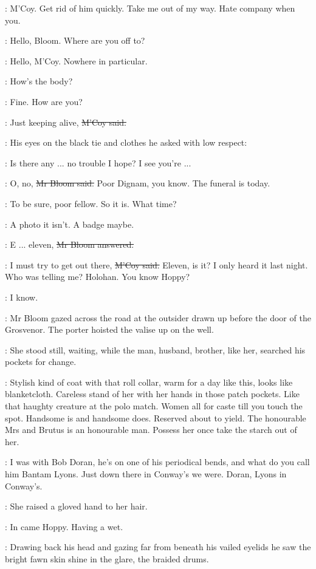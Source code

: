 \BloomInt:
M'Coy.
Get rid of him quickly.
Take me out of my way.
Hate company when you.

\mccoy:
Hello, Bloom.
Where are you off to?

\Bloom:
Hello, M'Coy.
Nowhere in particular.

\mccoy:
How's the body?

\Bloom:
Fine.
How are you?

\mccoy:
Just keeping alive,
\sout{M'Coy said.}

:
His eyes on the black tie and clothes
he asked with low respect:

\mccoy:
Is there any ... no trouble I hope?
I see you're ...

\Bloom:
O, no, \sout{Mr Bloom said.}
Poor Dignam, you know.
The funeral is today.

\mccoy:
To be sure, poor fellow.
So it is.
What time?

\BloomInt:
A photo it isn't.
A badge maybe.

\Bloom:
E ... eleven,
\sout{Mr Bloom answered.}

\mccoy:
I must try to get out there,
\sout{M'Coy said.}
Eleven, is it?
I only heard it last night.
Who was telling me?
Holohan.
You know Hoppy?

\Bloom:
I know.

:
Mr Bloom gazed across the road at the outsider
drawn up before the door of the Grosvenor.
The porter hoisted the valise up on the well.

:
She stood still, waiting,
while the man, husband, brother,
like her,
searched his pockets for change.

\BloomInt:
Stylish kind of coat with that roll collar,
warm for a day like this,
looks like blanketcloth.
Careless stand of her
with her hands in those patch pockets.
Like that haughty creature at the polo match.
Women all for caste till you touch the spot.
Handsome is and handsome does.
Reserved about to yield.
The honourable Mrs
and Brutus is an honourable man.
Possess her once
take the starch out of her.

\mccoy:
I was with Bob Doran,
he's on one of his periodical bends,
and what do you call him Bantam Lyons.
Just down there in Conway's
we were.
Doran, Lyons in Conway's.

:
She raised a gloved hand to her hair.

\mccoy:
In came Hoppy.
Having a wet.

:
Drawing back his head
and gazing far from beneath
his vailed eyelids
he saw the bright fawn skin shine in the glare,
the braided drums.


